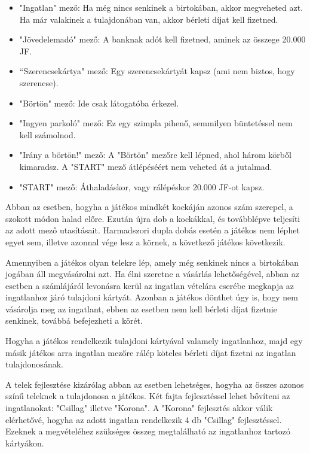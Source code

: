 \begin{itemize}
	\item"Ingatlan" mező: Ha még nincs senkinek a birtokában, akkor megveheted azt. Ha már valakinek a tulajdonában van, akkor bérleti díjat kell fizetned.
	\item "Jövedelemadó" mező: A banknak adót kell fizetned, aminek az összege 20.000 JF.
	\item “Szerencsekártya" mező: Egy szerencsekártyát kapsz (ami nem biztos, hogy szerencse).
	\item "Börtön" mező: Ide csak látogatóba érkezel.
	\item "Ingyen parkoló" mező: Ez egy szimpla pihenő, semmilyen büntetéssel nem kell számolnod.
	\item "Irány a börtön!" mező: A "Börtön" mezőre kell lépned, ahol három körből kimaradsz. A "START" mező átlépéséért nem veheted át a jutalmad.
	\item"START" mező: Áthaladáskor, vagy rálépéskor 20.000 JF-ot kapsz.
\end{itemize}


Abban az esetben, hogyha a játékos mindkét kockáján azonos szám szerepel, a szokott módon halad előre. Ezután újra dob a kockákkal, és továbblépve teljesíti az adott mező utasításait. Harmadszori dupla dobás esetén a játékos nem léphet egyet sem, illetve azonnal vége lesz a körnek, a következő játékos következik.


Amennyiben a játékos olyan telekre lép, amely még senkinek nincs a birtokában jogában áll megvásárolni azt. Ha élni szeretne a vásárlás lehetőségével, abban az esetben a számlájáról levonásra kerül az ingatlan vételára cserébe megkapja az ingatlanhoz járó tulajdoni kártyát. Azonban a játékos dönthet úgy is, hogy nem vásárolja meg az ingatlant, ebben az esetben nem kell bérleti díjat fizetnie senkinek, továbbá befejezheti a körét.


Hogyha a játékos rendelkezik tulajdoni kártyával valamely ingatlanhoz, majd egy másik játékos arra ingatlan mezőre rálép köteles bérleti díjat fizetni az ingatlan tulajdonosának.

A telek fejlesztése kizárólag abban az esetben lehetséges, hogyha az összes azonos színű teleknek a tulajdonosa a játékos. Két fajta fejlesztéssel lehet bővíteni az ingatlanokat: "Csillag" illetve "Korona". A "Korona" fejlesztés akkor válik elérhetővé, hogyha az adott ingatlan rendelkezik 4 db "Csillag" fejlesztéssel. Ezeknek a megvételéhez szükséges összeg megtalálható az ingatlanhoz tartozó kártyákon.

